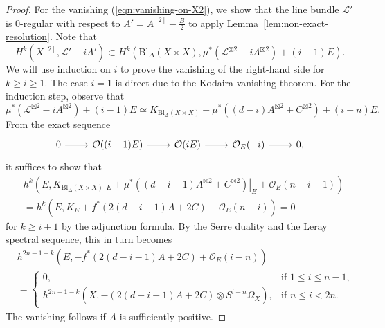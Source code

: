 \documentclass[a4paper]{amsart}
\numberwithin{equation}{section}
\theoremstyle{plain}
\theoremstyle{definition}
\theoremstyle{remark}
\numberwithin{figure}{section}
\numberwithin{table}{section}
\numberwithin{equation}{section}
\def \Lcal {\mathcal{L}}
\def \Ocal {\mathcal{O}}
\begin{document}
\begin{proof}
For the vanishing (\ref{eqn:vanishing-on-X2}), we show that the line bundle $\Lcal'$ is $0$-regular with respect to $A' = A^{[2]} - \frac{B}{2}$ to apply Lemma~\ref{lem:non-exact-resolution}.
Note that
 \[
  H^{k}(X^{[2]}, \Lcal' - iA') \subset H^{k}(\mathrm{Bl}_{\Delta}(X \times X), \mu^{\ast} (\Lcal^{\boxtimes 2} - iA^{\boxtimes 2}) + (i-1)E).
 \]
We will use induction on $i$ to prove the vanishing of the right-hand side for $k \geq i \geq 1$.
The case $i = 1$ is direct due to the Kodaira vanishing theorem.
For the induction step, observe that
 \[
  \mu^{\ast} (\Lcal^{\boxtimes 2} - iA^{\boxtimes 2}) + (i-1)E \simeq K_{\mathrm{Bl}_{\Delta}(X \times X)} + \mu^{\ast}((d-i)A^{\boxtimes 2} + C^{\boxtimes 2}) + (i-n)E.
 \]
From the exact sequence
 \[
  \begin{tikzcd}
      0 \arrow{r} & \Ocal((i-1)E) \arrow{r} & \Ocal(iE) \arrow{r} & \Ocal_E(-i) \arrow{r} & 0,
  \end{tikzcd}
 \]
it suffices to show that
 \begin{align*}
  &h^{k}(E, K_{\mathrm{Bl}_{\Delta}(X \times X)}|_E + \mu^{\ast}((d-i-1)A^{\boxtimes 2} + C^{\boxtimes 2})|_E + \Ocal_E(n-i-1)) \\
  &= h^{k}(E, K_{E} + f^{\ast}(2(d-i-1)A + 2C) + \Ocal_E(n-i)) = 0
 \end{align*}
for $k \geq i+1$ by the adjunction formula.
By the Serre duality and the Leray spectral sequence, this in turn becomes
 \begin{equation} \label{eqn:positivity-of-A-required}
  \begin{split}
  &h^{2n-1-k}(E, -f^{\ast}(2(d-i-1)A + 2C) + \Ocal_E(i-n)) \\
    &= \begin{cases}
        0, & \text{if } 1 \leq i \leq n-1, \\
        h^{2n-1-k}(X, -(2(d-i-1)A + 2C) \otimes S^{i-n}\Omega_X), & \text{if } n \leq i < 2n.
    \end{cases}
  \end{split}
 \end{equation}
The vanishing follows if $A$ is sufficiently positive.


\end{proof}
\end{document}
